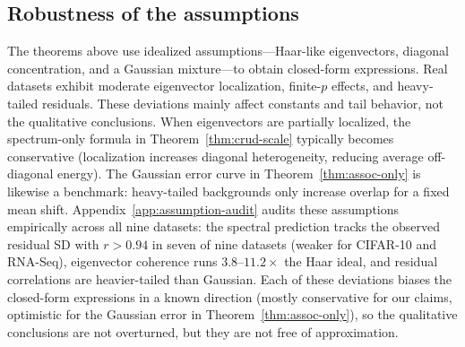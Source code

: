 \subsection{Robustness of the assumptions}
\label{app:approx-robust}

The theorems above use idealized assumptions---Haar-like eigenvectors, diagonal concentration, and a Gaussian mixture---to obtain closed-form expressions. Real datasets exhibit moderate eigenvector localization, finite-$p$ effects, and heavy-tailed residuals. These deviations mainly affect constants and tail behavior, not the qualitative conclusions. When eigenvectors are partially localized, the spectrum-only formula in Theorem~\ref{thm:crud-scale} typically becomes conservative (localization increases diagonal heterogeneity, reducing average off-diagonal energy). The Gaussian error curve in Theorem~\ref{thm:assoc-only} is likewise a benchmark: heavy-tailed backgrounds only increase overlap for a fixed mean shift. Appendix~\ref{app:assumption-audit} audits these assumptions empirically across all nine datasets: the spectral prediction tracks the observed residual SD with $r>0.94$ in seven of nine datasets (weaker for CIFAR-10 and RNA-Seq), eigenvector coherence runs $3.8$--$11.2\times$ the Haar ideal, and residual correlations are heavier-tailed than Gaussian. Each of these deviations biases the closed-form expressions in a known direction (mostly conservative for our claims, optimistic for the Gaussian error in Theorem~\ref{thm:assoc-only}), so the qualitative conclusions are not overturned, but they are not free of approximation.
